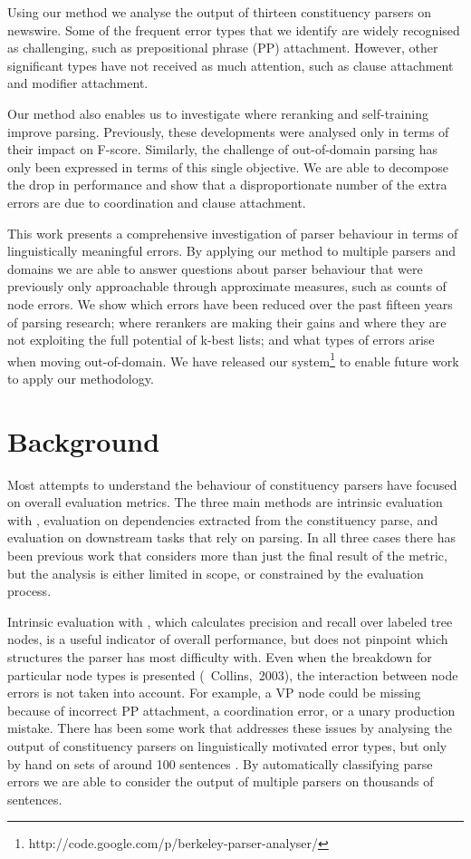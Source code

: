 Using our method we analyse the output of thirteen constituency parsers on
newswire.  Some of the frequent error types that we identify are widely recognised
as challenging, such as prepositional phrase (PP) attachment.  However, other
significant types have not received as much attention, such as clause
attachment and modifier attachment.

Our method also enables us to investigate where reranking and self-training
improve parsing.  Previously, these developments were analysed only in terms of
their impact on F-score.  Similarly, the challenge of out-of-domain parsing has
only been expressed in terms of this single objective.  We are able to
decompose the drop in performance and show that a disproportionate number of
the extra errors are due to coordination and clause attachment.

This work presents a comprehensive investigation of parser behaviour in terms
of linguistically meaningful errors.  By applying our method to multiple
parsers and domains we are able to answer questions about parser behaviour that
were previously only approachable through approximate measures, such as counts
of node errors.  We show which errors have been reduced over the past fifteen
years of parsing research; where rerankers are making their gains and where
they are not exploiting the full potential of k-best lists; and what types of
errors arise when moving out-of-domain.  We have released our
system\footnote{http://code.google.com/p/berkeley-parser-analyser/} to enable
future work to apply our methodology.

\section{Background}

Most attempts to understand the behaviour of constituency parsers have focused
on overall evaluation metrics.  The three main methods are intrinsic evaluation
with \parseval, evaluation on dependencies extracted from the
constituency parse, and evaluation on downstream tasks that rely on parsing.
In all three cases there has been previous work that
considers more than just the final result of the metric, but the analysis is
either limited in scope, or constrained by the evaluation process.

Intrinsic evaluation with \parseval, which calculates precision and recall over
labeled tree nodes, is a useful indicator of overall performance, but does not
pinpoint which structures the parser has most difficulty with.  Even when the
breakdown for particular node types is presented
(\eg~Collins,~2003\nocite{Collins:2003}), the interaction between node errors
is not taken into account.  For example, a VP node could be missing because of
incorrect PP attachment, a coordination error, or a unary production mistake.
There has been some work that addresses these issues by analysing the output of
constituency parsers on linguistically motivated error types, but only by hand
on sets of around 100 sentences
\cite{Hara:2007:EIR:1621410.1621412,yu-EtAl:2011:IWPT}.  By automatically
classifying parse errors we are able to consider the output of multiple parsers
on thousands of sentences.


